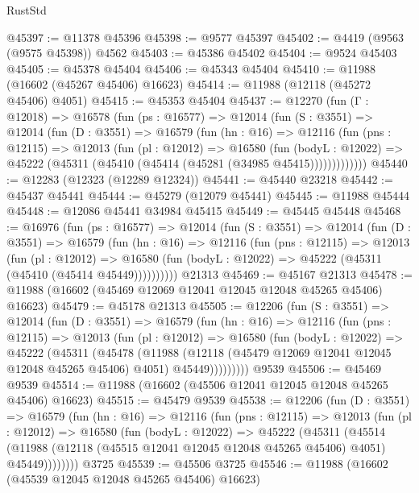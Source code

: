 \begin{lexlean}{RustStd}
\begin{coremodule}
@45397 := @11378 @45396
@45398 := @9577 @45397
@45402 := @4419 (@9563 (@9575 @45398)) @4562
@45403 := @45386 @45402
@45404 := @9524 @45403
@45405 := @45378 @45404
@45406 := @45343 @45404
@45410 := @11988 (@16602 (@45267 @45406) @16623)
@45414 := @11988 (@12118 (@45272 @45406) @4051)
@45415 := @45353 @45404
@45437 := @12270
    (fun (Γ : @12018) =>
    @16578
      (fun (ps : @16577) =>
      @12014
        (fun (S : @3551) =>
        @12014
          (fun (D : @3551) =>
          @16579
            (fun (hn : @16) =>
            @12116
              (fun (pns : @12115) =>
              @12013
                (fun (pl : @12012) =>
                @16580
                  (fun (bodyL : @12022) =>
                  @45222 (@45311 (@45410 (@45414 (@45281 (@34985 @45415)))))))))))))
@45440 := @12283 (@12323 (@12289 @12324))
@45441 := @45440 @23218
@45442 := @45437 @45441
@45444 := @45279 (@12079 @45441)
@45445 := @11988 @45444
@45448 := @12086 @45441 @34984 @45415
@45449 := @45445 @45448
@45468 := @16976
    (fun (ps : @16577) =>
    @12014
      (fun (S : @3551) =>
      @12014
        (fun (D : @3551) =>
        @16579
          (fun (hn : @16) =>
          @12116
            (fun (pns : @12115) =>
            @12013
              (fun (pl : @12012) =>
              @16580 (fun (bodyL : @12022) => @45222 (@45311 (@45410 (@45414 @45449))))))))))
    @21313
@45469 := @45167 @21313
@45478 := @11988 (@16602 (@45469 @12069 @12041 @12045 @12048 @45265 @45406) @16623)
@45479 := @45178 @21313
@45505 := @12206
    (fun (S : @3551) =>
    @12014
      (fun (D : @3551) =>
      @16579
        (fun (hn : @16) =>
        @12116
          (fun (pns : @12115) =>
          @12013
            (fun (pl : @12012) =>
            @16580
              (fun (bodyL : @12022) =>
              @45222
                (@45311
                  (@45478
                    (@11988
                      (@12118 (@45479 @12069 @12041 @12045 @12048 @45265 @45406) @4051)
                      @45449)))))))))
    @9539
@45506 := @45469 @9539
@45514 := @11988 (@16602 (@45506 @12041 @12045 @12048 @45265 @45406) @16623)
@45515 := @45479 @9539
@45538 := @12206
    (fun (D : @3551) =>
    @16579
      (fun (hn : @16) =>
      @12116
        (fun (pns : @12115) =>
        @12013
          (fun (pl : @12012) =>
          @16580
            (fun (bodyL : @12022) =>
            @45222
              (@45311
                (@45514
                  (@11988 (@12118 (@45515 @12041 @12045 @12048 @45265 @45406) @4051) @45449))))))))
    @3725
@45539 := @45506 @3725
@45546 := @11988 (@16602 (@45539 @12045 @12048 @45265 @45406) @16623)

\end{coremodule}
\end{lexlean}
